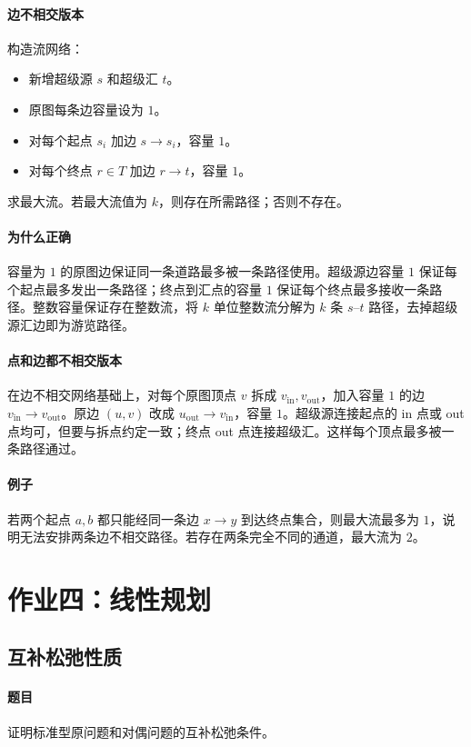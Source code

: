 \documentclass[UTF8,openany,12pt]{ctexbook}
\theoremstyle{remark}
\begin{document}
\paragraph{边不相交版本}
构造流网络：
\begin{itemize}
  \item 新增超级源 $s$ 和超级汇 $t$。
  \item 原图每条边容量设为 $1$。
  \item 对每个起点 $s_i$ 加边 $s\to s_i$，容量 $1$。
  \item 对每个终点 $r\in T$ 加边 $r\to t$，容量 $1$。
\end{itemize}
求最大流。若最大流值为 $k$，则存在所需路径；否则不存在。

\paragraph{为什么正确}
容量为 $1$ 的原图边保证同一条道路最多被一条路径使用。超级源边容量 $1$ 保证每个起点最多发出一条路径；终点到汇点的容量 $1$ 保证每个终点最多接收一条路径。整数容量保证存在整数流，将 $k$ 单位整数流分解为 $k$ 条 $s$--$t$ 路径，去掉超级源汇边即为游览路径。

\paragraph{点和边都不相交版本}
在边不相交网络基础上，对每个原图顶点 $v$ 拆成
$v_{\mathrm{in}},v_{\mathrm{out}}$，加入容量 $1$ 的边
$v_{\mathrm{in}}\to v_{\mathrm{out}}$。原边 $(u,v)$ 改成
$u_{\mathrm{out}}\to v_{\mathrm{in}}$，容量 $1$。超级源连接起点的 in 点或 out 点均可，但要与拆点约定一致；终点 out 点连接超级汇。这样每个顶点最多被一条路径通过。

\paragraph{例子}
若两个起点 $a,b$ 都只能经同一条边 $x\to y$ 到达终点集合，则最大流最多为 $1$，说明无法安排两条边不相交路径。若存在两条完全不同的通道，最大流为 $2$。

\section{作业四：线性规划}

\subsection{互补松弛性质}

\paragraph{题目}
证明标准型原问题和对偶问题的互补松弛条件。
\end{document}
